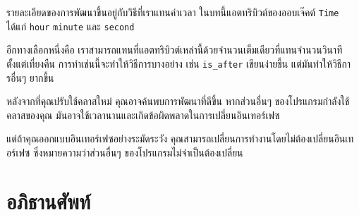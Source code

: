 
รายละเอียดของการพัฒนาขึ้นอยู่กับวิธีที่เราแทนค่าเวลา  ในบทนี้แอตทริบิวต์ของออบเจ๊คต์ {\tt Time} ได้แก่ {\tt hour} {\tt minute} และ
{\tt second}


อีกทางเลือกหนึ่งคือ เราสามารถแทนที่แอตทริบิวต์เหล่านี้ด้วยจำนวนเต็มเดียวที่แทนจำนวนวินาทีตั้งแต่เที่ยงคืน 
การทำเช่นนี้จะทำให้วิธีการบางอย่าง เช่น \verb"is_after" เขียนง่ายขึ้น แต่มันทำให้วิธีการอื่นๆ ยากขึ้น



หลังจากที่คุณปรับใช้คลาสใหม่ คุณอาจค้นพบการพัฒนาที่ดีขึ้น หากส่วนอื่นๆ ของโปรแกรมกำลังใช้คลาสของคุณ 
มันอาจใช้เวลานานและเกิดข้อผิดพลาดในการเปลี่ยนอินเทอร์เฟซ
  


แต่ถ้าคุณออกแบบอินเทอร์เฟซอย่างระมัดระวัง คุณสามารถเปลี่ยนการทำงานโดยไม่ต้องเปลี่ยนอินเทอร์เฟซ ซึ่งหมายความว่าส่วนอื่นๆ ของโปรแกรมไม่จำเป็นต้องเปลี่ยน


\section{อภิธานศัพท์}

